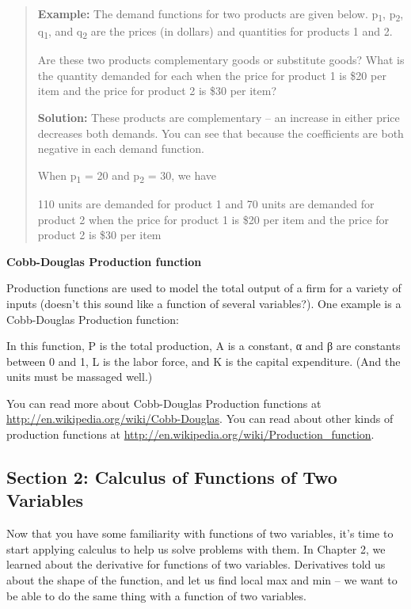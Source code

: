 \begin{quote}
\textbf{Example:} The demand functions for two products are given below.
p\textsubscript{1}, p\textsubscript{2}, q\textsubscript{1}, and
q\textsubscript{2} are the prices (in dollars) and quantities for
products 1 and 2.

Are these two products complementary goods or substitute goods? What is
the quantity demanded for each when the price for product 1 is \$20 per
item and the price for product 2 is \$30 per item?

\textbf{Solution:} These products are complementary -- an increase in
either price decreases both demands. You can see that because the
coefficients are both negative in each demand function.

When p\textsubscript{1} = 20 and p\textsubscript{2} = 30, we have

110 units are demanded for product 1 and 70 units are demanded for
product 2 when the price for product 1 is \$20 per item and the price
for product 2 is \$30 per item
\end{quote}

\textbf{Cobb-Douglas Production function}

Production functions are used to model the total output of a firm for a
variety of inputs (doesn't this sound like a function of several
variables?). One example is a Cobb-Douglas Production function:

In this function, P is the total production, A is a constant, α and β
are constants between 0 and 1, L is the labor force, and K is the
capital expenditure. (And the units must be massaged well.)

You can read more about Cobb-Douglas Production functions at
\url{http://en.wikipedia.org/wiki/Cobb-Douglas}. You can read about
other kinds of production functions at
\url{http://en.wikipedia.org/wiki/Production_function}.

\hypertarget{section-2-calculus-of-functions-of-two-variables}{\subsection{Section
2: Calculus of Functions of Two
Variables}\label{section-2-calculus-of-functions-of-two-variables}}

Now that you have some familiarity with functions of two variables, it's
time to start applying calculus to help us solve problems with them. In
Chapter 2, we learned about the derivative for functions of two
variables. Derivatives told us about the shape of the function, and let
us find local max and min -- we want to be able to do the same thing
with a function of two variables.

